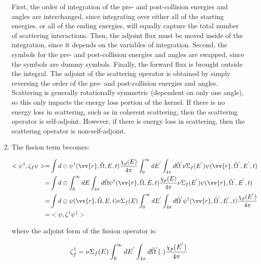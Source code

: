 \documentclass[10pt]{article}
\begin{document}
\begin{flushleft}
\begin{enumerate}
First, the order of integration of the pre- and post-collision energies and angles are interchanged, since integrating over either all of the starting energies, or all of the ending energies, will equally capture the total number of scattering interactions. Then, the adjoint flux must be moved inside of the integration, since it depends on the variables of integration. Second, the symbols for the pre- and post-collision energies and angles are swapped, since the symbols are dummy symbols. Finally, the forward flux is brought outside the integral. The adjoint of the scattering operator is obtained by simply reversing the order of the pre- and post-collision energies and angles. Scattering is generally rotationally symmetric (dependent on only one angle), so this only impacts the energy loss portion of the kernel. If there is no energy loss in scattering, such as in coherent scattering, then the scattering operator is self-adjoint. However, if there is energy loss in scattering, then the scattering operator is non-self-adjoint.

\item The fission term becomes:

\begin{equation}
\begin{aligned}
<\psi^\dagger,\zeta_f\psi>=& \int d\oslash\psi^\dagger(\vv{r},\hat{\Omega},E,t)\frac{\chi_p(E)}{4\pi}\int_0^\infty dE^{'}\int_{4\pi}d\hat{\Omega}^{'}\nu\Sigma_f(E^{'})\psi(\vv{r},\hat{\Omega}^{'},E^{'},t)\\
=& \int d\oslash\int_0^\infty dE\int_{4\pi}d\hat{\Omega}\psi^\dagger(\vv{r},\hat{\Omega},E,t)\frac{\chi_p(E)}{4\pi}\nu\Sigma_f(E^{'})\psi(\vv{r},\hat{\Omega}^{'},E^{'},t)\\
=& \int d\oslash\psi(\vv{r},\hat{\Omega},E,t)\nu\Sigma_f(E)\int_0^\infty dE^{'}\int_{4\pi}d\hat{\Omega}^{'}\psi^\dagger(\vv{r},\hat{\Omega}^{'},E^{'},t)\frac{\chi_p(E^{'})}{4\pi}\\
=& <\psi,\zeta^\dagger\psi^\dagger>\\
\end{aligned}
\end{equation}

where the adjoint form of the fission operator is:

\begin{equation}
\zeta_f^\dagger=\nu\Sigma_f(E)\int_0^\infty dE^{'}\int_{4\pi}d\hat{\Omega}^{'}(.)\frac{\chi_p(E^{'})}{4\pi}\\
\end{equation}


\end{enumerate}
\end{flushleft}
\end{document}

